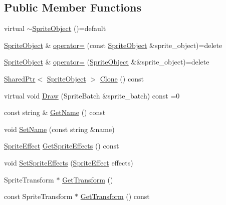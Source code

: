 \subsection*{Public Member Functions}
\begin{DoxyCompactItemize}
\item 
virtual \hyperlink{classmage_1_1_sprite_object_a88c02e6af2ab79389de368dd9ba32930}{$\sim$\+Sprite\+Object} ()=default
\item 
\hyperlink{classmage_1_1_sprite_object}{Sprite\+Object} \& \hyperlink{classmage_1_1_sprite_object_ab24af642e7c49a13ca5526248f106b4e}{operator=} (const \hyperlink{classmage_1_1_sprite_object}{Sprite\+Object} \&sprite\+\_\+object)=delete
\item 
\hyperlink{classmage_1_1_sprite_object}{Sprite\+Object} \& \hyperlink{classmage_1_1_sprite_object_a0d098954e6ef5b331b2b7e6f6cb3c21e}{operator=} (\hyperlink{classmage_1_1_sprite_object}{Sprite\+Object} \&\&sprite\+\_\+object)=delete
\item 
\hyperlink{namespacemage_a1e01ae66713838a7a67d30e44c67703e}{Shared\+Ptr}$<$ \hyperlink{classmage_1_1_sprite_object}{Sprite\+Object} $>$ \hyperlink{classmage_1_1_sprite_object_a309befb66869a363a7243b7fe4d32f49}{Clone} () const
\item 
virtual void \hyperlink{classmage_1_1_sprite_object_a1c1c885fe7846f7ee1cc0b73571c2fa0}{Draw} (Sprite\+Batch \&sprite\+\_\+batch) const =0
\item 
const string \& \hyperlink{classmage_1_1_sprite_object_aceda3826a222603d30e2d2b827f491bb}{Get\+Name} () const
\item 
void \hyperlink{classmage_1_1_sprite_object_a784cd7d61f3a9f71a521656ae3199366}{Set\+Name} (const string \&name)
\item 
\hyperlink{namespacemage_a9cfe18123066ba4236f548f9de75d881}{Sprite\+Effect} \hyperlink{classmage_1_1_sprite_object_af759fd1b68e2707b0f084da183e0b5f1}{Get\+Sprite\+Effects} () const
\item 
void \hyperlink{classmage_1_1_sprite_object_ad2eb556b5965d894e81cca96c5c0540b}{Set\+Sprite\+Effects} (\hyperlink{namespacemage_a9cfe18123066ba4236f548f9de75d881}{Sprite\+Effect} effects)
\item 
Sprite\+Transform $\ast$ \hyperlink{classmage_1_1_sprite_object_ab48dfd7c6833067d67634bc89d7cb99c}{Get\+Transform} ()
\item 
const Sprite\+Transform $\ast$ \hyperlink{classmage_1_1_sprite_object_a73733c89ee3c47d0e8b8bb81a06bc48c}{Get\+Transform} () const
\end{DoxyCompactItemize}

